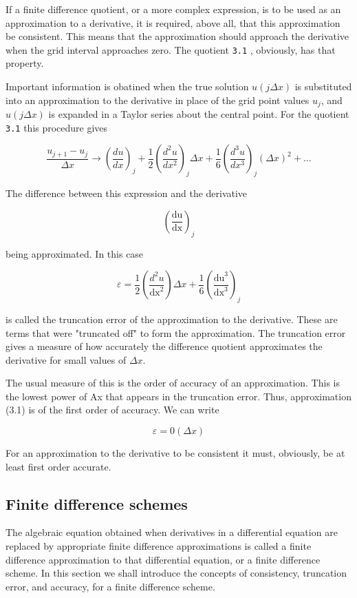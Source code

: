 If a finite difference quotient, or a more complex expression, is to be
used as an approximation to a derivative, it is required, above all,
that this approximation be consistent. This means that the approximation
should approach the derivative when the grid interval approaches zero.
The quotient \texttt{3.1} , obviously, has that property.

Important information is obatined when the true solution
\(u (j\Delta x)\) is substituted into an approximation to the derivative
in place of the grid point values \(u_{j}\), and \(u(j\Delta x)\) is
expanded in a Taylor series about the central point. For the quotient
\texttt{3.1} this procedure gives

\[\frac{u_{j+1} - u_j}{\Delta x} \to \left( \frac{d u}{d x} \right)_j +
\frac{1}{2} \left( \frac{d^2 u}{dx^2} \right)_j \Delta x +
\frac{1}{6} \left( \frac{d^3 u}{dx^3} \right)_j
( \Delta x )^2 + \ldots\]

The difference between this expression and the derivative

\[\left( \frac{\text{du}}{\text{dx}} \right)_{j}\]

being approximated. In this case

\[\varepsilon = \frac{1}{2}\left( \frac{d^{2}u}{\text{dx}^{2}} \right)\Delta x + \frac{1}{6}\left( \frac{\text{du}^{3}}{\text{dx}^{3}} \right)_{j}\]

is called the truncation error of the approximation to the derivative.
These are terms that were "truncated off" to form the approximation. The
truncation error gives a measure of how accurately the difference
quotient approximates the derivative for small values of $\Delta x$.

The usual measure of this is the order of accuracy of an approximation.
This is the lowest power of Ax that appears in the truncation error.
Thus, approximation (3.1) is of the first order of accuracy. We can
write

\[\varepsilon = 0(\Delta x)\]

For an approximation to the derivative to be consistent it must,
obviously, be at least first order accurate.

\subsection{\texorpdfstring{\textbf{Finite difference
schemes}}{Finite difference schemes}}\label{finite-difference-schemes}

The algebraic equation obtained when derivatives in a differential
equation are replaced by appropriate finite difference approximations is
called a finite difference approximation to that differential equation,
or a finite difference scheme. In this section we shall introduce the
concepts of consistency, truncation error, and accuracy, for a finite
difference scheme.

